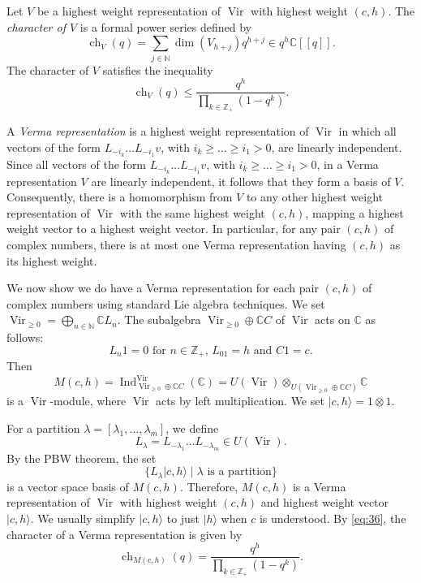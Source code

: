 \documentclass[a4paper, 12pt, reqno]{amsart}
\theoremstyle{remark}
\DeclareMathOperator{\Vir}{Vir}
\DeclareMathOperator{\ch}{ch}
\DeclareMathOperator{\Ind}{Ind}
\begin{document}
Let $V$ be a highest weight representation of $\Vir$ with highest weight $(c, h)$.
The \emph{character of $V$} is a formal power series defined by
\begin{equation*}
  \ch_V(q) = \sum_{j \in \mathbb{N}}\dim(V_{h + j})q^{h + j} \in q^h\mathbb{C}[[q]].
\end{equation*}
The character of $V$ satisfies the inequality
\begin{equation*}
  \ch_V(q) \le \frac{q^h}{\prod_{k \in \mathbb{Z}_+}(1 - q^k)}.
\end{equation*}

A \emph{Verma representation} is a highest weight representation of $\Vir$ in which all vectors of the form $L_{-i_k}\dots L_{-i_1}v$, with $i_k \ge \dots \ge i_1 > 0$, are linearly independent.
Since all vectors of the form $L_{-i_k}\dots L_{-i_1}v$, with $i_k \ge \dots \ge i_1 > 0$, in a Verma representation $V$ are linearly independent, it follows that they form a basis of $V$.
Consequently, there is a homomorphism from $V$ to any other highest weight representation of $\Vir$ with the same highest weight $(c, h)$, mapping a highest weight vector to a highest weight vector.
In particular, for any pair $(c, h)$ of complex numbers, there is at most one Verma representation having $(c, h)$ as its highest weight.

We now show we do have a Verma representation for each pair $(c, h)$ of complex numbers using standard Lie algebra techniques.
We set $\Vir_{\ge 0} = \bigoplus_{n \in \mathbb{N}}\mathbb{C}L_n$.
The subalgebra $\Vir_{\ge 0} \oplus \mathbb{C}C$ of $\Vir$ acts on $\mathbb{C}$ as follows:
\begin{equation*}
  \text{$L_n1 = 0$ for $n \in \mathbb{Z}_+$, $L_01 = h$ and $C1 = c$}.
\end{equation*}
Then
\begin{equation*}
  M(c, h) = \Ind^{\Vir}_{\Vir_{\ge 0} \oplus \mathbb{C}C}(\mathbb{C}) = U(\Vir) \otimes_{U(\Vir_{\ge 0} \oplus \mathbb{C}C)} \mathbb{C}
\end{equation*}
is a $\Vir$-module, where $\Vir$ acts by left multiplication.
We set $|c, h\rangle = 1\otimes1$.

For a partition $\lambda = [\lambda_1, \dots, \lambda_m]$, we define
\begin{equation*}
  L_{\lambda} = L_{-\lambda_1}\dots L_{-\lambda_m} \in U(\Vir).
\end{equation*}
By the PBW theorem, the set
\begin{equation*}
  \{L_{\lambda}|c, h\rangle \mid \text{$\lambda$ is a partition}\}
\end{equation*}
is a vector space basis of $M(c, h)$.
Therefore, $M(c, h)$ is a Verma representation of $\Vir$ with highest weight $(c, h)$ and highest weight vector $|c, h\rangle$.
We usually simplify $|c, h\rangle$ to just $|h\rangle$ when $c$ is understood.
By \eqref{eq:36}, the character of a Verma representation is given by
\begin{equation*}
  \ch_{M(c, h)}(q) = \frac{q^h}{\prod_{k \in \mathbb{Z}_+}(1 - q^k)}.
\end{equation*}
\end{document}

